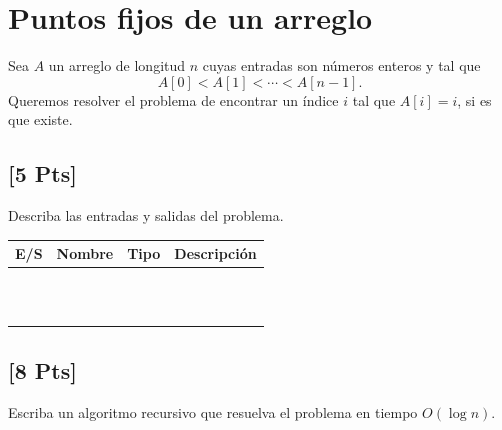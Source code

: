 


\maketitle

\section{Puntos fijos de un arreglo}
Sea $A$ un arreglo de longitud $n$ cuyas entradas son números enteros y tal que
\[
	A[0] < A[1] < \cdots < A[n-1].
\]
Queremos resolver el problema de encontrar un índice $i$ tal que $A[i]= i$, si es
que existe.

\subsection{[5 Pts]} Describa las entradas y salidas del problema.

\begin{tabular}{|| l| l| l| l||}
	\hline
	{\bf E/S} & {\bf Nombre} & {\bf Tipo} & {\bf Descripción}\\
	\hline
	        \hspace{1cm} & \hspace{3cm} & \hspace{2cm} & \hspace{4cm} \\
	          &          &          & \\
	          &          &          & \\
	          &          &          & \\
	          &          &          & \\
	          &          &          & \\
	          &          &          & \\
	          &          &          & \\
	          &          &          & \\
	          &          &          & \\
	          &          &          & \\
		  \hline
\end{tabular}

\subsection{[8 Pts]} Escriba un algoritmo recursivo que resuelva el problema en
tiempo $O(\log n)$.


